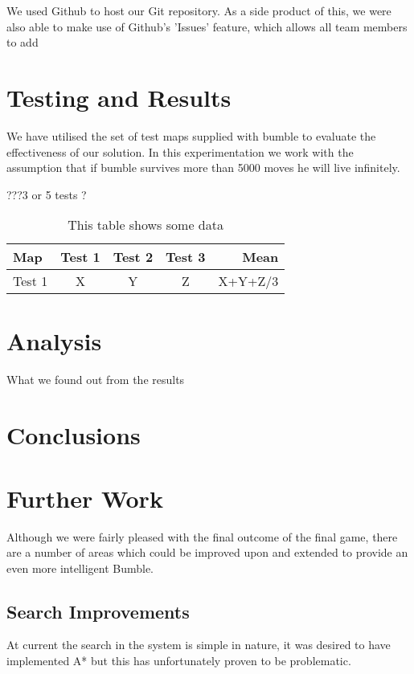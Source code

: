 \documentclass[a4paper,oneside]{report}
\begin{document}
We used Github to host our Git repository. As a side product of this, we were also able to make use of Github's 'Issues' feature, which allows all team members to add 
	
\section{Testing and Results}

We have utilised the set of test maps supplied with bumble to evaluate the effectiveness of our solution. In this experimentation we work with the assumption that if bumble survives more than 5000 moves he will live infinitely.
	
	???3 or 5 tests ? 

\begin{table}[h!]
	\centering
	\begin{tabular}{| l | c | c | c | r |}
	\hline
		Map & Test 1 & Test 2 & Test 3 & Mean \\ \hline
		Test 1 &  X & Y & Z & X+Y+Z/3 \\ \hline
	\end{tabular}
	\caption{This table shows some data}
	\label{tab:myfirsttable}
\end{table}

\section{Analysis}

What we found out from the results

\section{Conclusions}

\section{Further Work}

Although we were fairly pleased with the final outcome of the final game, there are a number of areas which could be improved upon and extended to provide an even more intelligent Bumble.
	
\subsection{Search Improvements}

At current the search in the system is simple in nature, it was desired to have implemented A* but this has unfortunately proven to be problematic.
		
\end{document}
